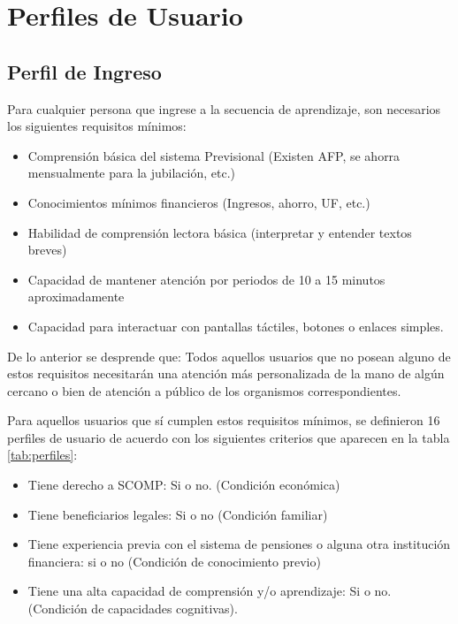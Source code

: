 \newpage
\section*{Perfiles de Usuario}
\subsection*{Perfil de Ingreso}
Para cualquier persona que ingrese a la secuencia de aprendizaje, son necesarios los siguientes requisitos mínimos: 
\begin{itemize}
    \item Comprensión básica del sistema Previsional (Existen AFP, se ahorra mensualmente para la jubilación, etc.) 
    \item Conocimientos mínimos financieros (Ingresos, ahorro, UF, etc.)
    \item Habilidad de comprensión lectora básica (interpretar y entender textos breves)
    \item Capacidad de mantener atención por periodos de 10 a 15 minutos aproximadamente
    \item Capacidad para interactuar con pantallas táctiles, botones o enlaces simples.
\end{itemize}

   
De lo anterior se desprende que: Todos aquellos usuarios que no posean alguno de estos requisitos necesitarán una atención más personalizada de la mano de algún cercano o bien de atención a público de los organismos correspondientes. 

Para aquellos usuarios que sí cumplen estos requisitos mínimos, se definieron 16 perfiles de usuario de acuerdo con los siguientes criterios que aparecen en la tabla \ref{tab:perfiles}:
\begin{itemize}
    \item Tiene derecho a SCOMP: Si o no. (Condición económica)
    \item Tiene beneficiarios legales: Si o no (Condición familiar) 
    \item Tiene experiencia previa con el sistema de pensiones o alguna otra institución financiera: si o no (Condición de conocimiento previo) 
    \item Tiene una alta capacidad de comprensión y/o aprendizaje: Si o no. (Condición de capacidades cognitivas). 
\end{itemize}


